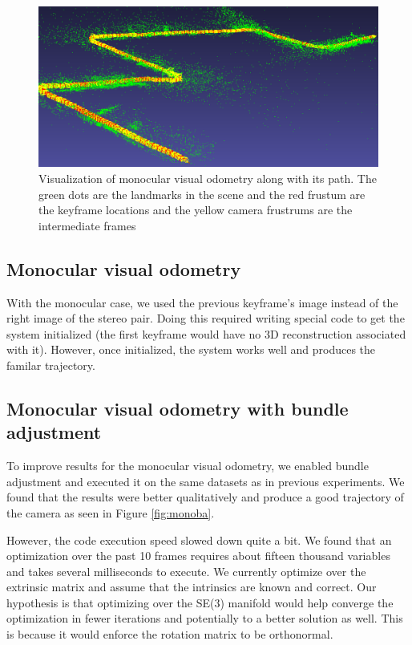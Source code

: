 \documentclass{article}
\begin{document}
\begin{figure}
\includegraphics[width=\textwidth]{./path}
\caption{Visualization of monocular visual odometry along with its path. The green dots are the landmarks in the scene and the red frustum are the keyframe locations and the yellow camera frustrums are the intermediate frames}
\label{fig:closeup}
\end{figure}

\subsection{Monocular visual odometry}
With the monocular case, we used the previous keyframe's image instead of the right image of the stereo pair. Doing this required writing special code to get the system initialized (the first keyframe would have no 3D reconstruction associated with it). However, once initialized, the system works well and produces the familar trajectory.

\subsection{Monocular visual odometry with bundle adjustment}
To improve results for the monocular visual odometry, we enabled bundle adjustment and executed it on the same datasets as in previous experiments. We found that the results were better qualitatively and produce a good trajectory of the camera as seen in Figure \ref{fig:monoba}.

However, the code execution speed slowed down quite a bit. We found that an optimization over the past 10 frames requires about fifteen thousand variables and takes several milliseconds to execute. We currently optimize over the extrinsic matrix and assume that the intrinsics are known and correct. Our hypothesis is that optimizing over the SE(3) manifold would help converge the optimization in fewer iterations and potentially to a better solution as well. This is because it would enforce the rotation matrix to be orthonormal.
\end{document}
